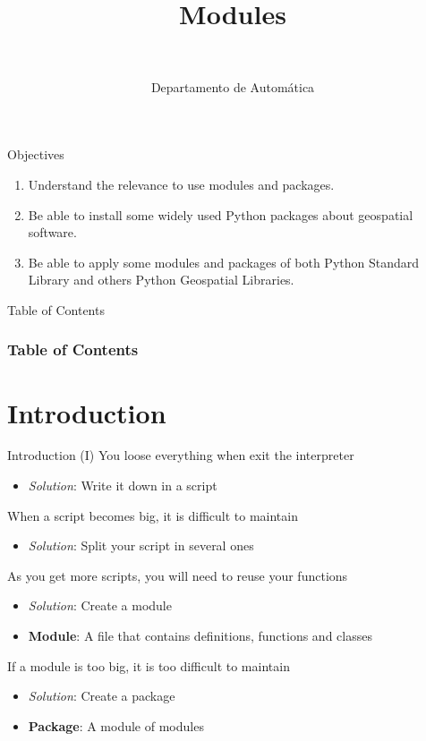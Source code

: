 \documentclass[10pt,compress]{beamer} %
\title[Modules]{Modules}
\author{\asignatura\\\carrera}
\institute{}
\date{Departamento de Automática}
\begin{document}
{\titlepageBlue
    \begin{frame}
        \titlepage
    \end{frame}
}

\institute{\asignatura}

\begin{frame}[plain]{}
	\begin{block}{Objectives}
		\begin{enumerate}
		\item Understand the relevance to use modules and packages.
		\item Be able to install some widely used Python packages about  geospatial software.
		\item Be able to apply some modules and packages of both Python Standard Library and others Python Geospatial Libraries.
		\end{enumerate}
	\end{block}
\end{frame}

{
\begin{frame}[shrink]{Table of Contents}
 \frametitle{Table of Contents}
 \tableofcontents
\end{frame}
}

\section{Introduction}
\begin{frame}{Introduction (I)}
		You loose everything when exit the interpreter
			\begin{itemize}
			\item \textit{Solution}: Write it down in a script
			\end{itemize}
		When a script becomes big, it is difficult to maintain
			\begin{itemize}
			\item \textit{Solution}: Split your script in several ones
			\end{itemize}
		As you get more scripts, you will need to reuse your functions
			\begin{itemize}
			\item \textit{Solution}: Create a \alert{module}
			\item \textbf{Module}: A file that contains definitions, functions and classes
			\end{itemize}
		If a module is too big, it is too difficult to maintain
			\begin{itemize}
			\item \textit{Solution}: Create a \alert{package}
			\item \textbf{Package}: A module of modules
			\end{itemize}
\end{frame}
\end{document}

